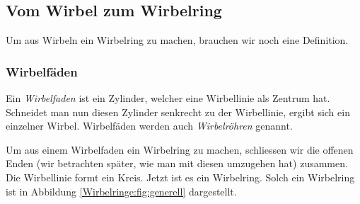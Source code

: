 \subsection{Vom Wirbel zum Wirbelring}

Um aus Wirbeln ein Wirbelring zu machen, brauchen wir noch eine Definition.

\subsubsection*{Wirbelfäden}

Ein {\em Wirbelfaden} ist ein Zylinder, welcher eine Wirbellinie als Zentrum hat.
Schneidet man nun diesen Zylinder senkrecht zu der Wirbellinie, ergibt sich ein einzelner Wirbel.
Wirbelfäden werden auch {\em Wirbelröhren} genannt.

Um aus einem Wirbelfaden ein Wirbelring zu machen, schliessen wir die offenen Enden (wir betrachten später, wie man mit diesen umzugehen hat) zusammen.
Die Wirbellinie formt ein Kreis.
Jetzt ist es ein Wirbelring. 
Solch ein Wirbelring ist in Abbildung \ref{Wirbelringe:fig:generell} dargestellt.


